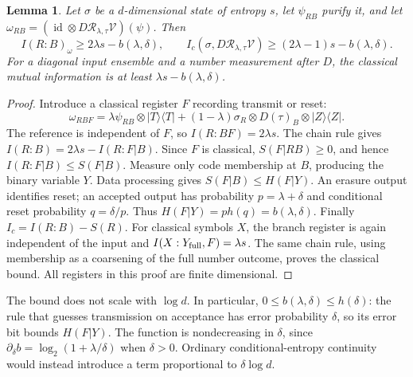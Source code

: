 \documentclass[11pt]{article}
\newtheorem{lemma}[theorem]{Lemma}
\newcommand{\Rcal}{\mathcal R_{\lambda,\tau}}
\newcommand{\id}{\operatorname{id}}
\begin{document}
\begin{lemma}\label{lem:hidden}
Let $\sigma$ be a $d$-dimensional state of entropy $s$, let $\psi_{RB}$
purify it, and let $\omega_{RB}=(\id\otimes D\Rcal\mathcal V)(\psi)$.
Then
\begin{equation}\label{eq:information}
 I(R:B)_\omega\ge2\lambda s-b(\lambda,\delta),\qquad
 I_c(\sigma,D\Rcal\mathcal V)\ge(2\lambda-1)s-b(\lambda,\delta).
\end{equation}
For a diagonal input ensemble and a number measurement after $D$,
the classical mutual information is at least
$\lambda s-b(\lambda,\delta)$.
\end{lemma}
\begin{proof}
Introduce a classical register $F$ recording transmit or reset:
\[
 \omega_{RBF}
 =\lambda\psi_{RB}\otimes|T\rangle\langle T|
 +(1-\lambda)\sigma_R\otimes D(\tau)_B\otimes|Z\rangle\langle Z|.
\]
The reference is independent of $F$, so $I(R:BF)=2\lambda s$.
The chain rule gives
$I(R:B)=2\lambda s-I(R:F|B)$.
Since $F$ is classical, $S(F|RB)\ge0$, and hence
$I(R:F|B)\le S(F|B)$.
Measure only code membership at $B$, producing the binary variable $Y$.
Data processing gives $S(F|B)\le H(F|Y)$.
An erasure output identifies reset; an accepted output has probability
$p=\lambda+\delta$ and conditional reset probability $q=\delta/p$.
Thus $H(F|Y)=p h(q)=b(\lambda,\delta)$.
Finally $I_c=I(R:B)-S(R)$.
For classical symbols $X$, the branch register is again independent
of the input and $I(X:Y_{\rm full},F)=\lambda s$.
The same chain rule, using membership as a coarsening of the full
number outcome, proves the classical bound.
All registers in this proof are finite dimensional.
\end{proof}
The bound does not scale with $\log d$. In particular,
$0\le b(\lambda,\delta)\le h(\delta)$: the rule that guesses
transmission on acceptance has error probability $\delta$, so its error
bit bounds $H(F|Y)$. The function is nondecreasing in $\delta$, since
$\partial_\delta b=\log_2(1+\lambda/\delta)$ when $\delta>0$.
Ordinary conditional-entropy continuity \cite{winter} would instead
introduce a term proportional to $\delta\log d$.
\end{document}
